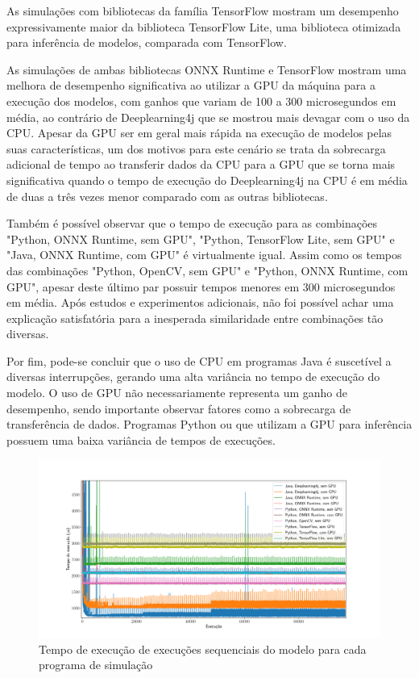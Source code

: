 As simulações com bibliotecas da família TensorFlow mostram um desempenho expressivamente maior da biblioteca TensorFlow Lite, uma biblioteca otimizada para inferência de modelos, comparada com TensorFlow.

As simulações de ambas bibliotecas ONNX Runtime e TensorFlow mostram uma melhora de desempenho significativa ao utilizar a GPU da máquina para a execução dos modelos, com ganhos que variam de 100 a 300 microsegundos em média, ao contrário de Deeplearning4j que se mostrou mais devagar com o uso da CPU. Apesar da GPU ser em geral mais rápida na execução de modelos pelas suas características, um dos motivos para este cenário se trata da sobrecarga adicional de tempo ao transferir dados da CPU para a GPU que se torna mais significativa quando o tempo de execução do Deeplearning4j na CPU é em média de duas a três vezes menor comparado com as outras bibliotecas.

Também é possível observar que o tempo de execução para as combinações "Python, ONNX Runtime, sem GPU", "Python, TensorFlow Lite, sem GPU" e "Java, ONNX Runtime, com GPU" é virtualmente igual. Assim como os tempos das combinações "Python, OpenCV, sem GPU" e "Python, ONNX Runtime, com GPU", apesar deste último par possuir tempos menores em 300 microsegundos em média. Após estudos e experimentos adicionais, não foi possível achar uma explicação satisfatória para a inesperada similaridade entre combinações tão diversas.

Por fim, pode-se concluir que o uso de CPU em programas Java é suscetível a diversas interrupções, gerando uma alta variância no tempo de execução do modelo. O uso de GPU não necessariamente representa um ganho de desempenho, sendo importante observar fatores como a sobrecarga de transferência de dados. Programas Python ou que utilizam a GPU para inferência possuem uma baixa variância de tempos de execuções.

\begin{figure}[h]
  \centerline{\includegraphics[width=\paperwidth]{img/all.pdf}}
  \caption{Tempo de execução de execuções sequenciais do modelo para cada programa de simulação}
  \label{fig:all}
\end{figure}